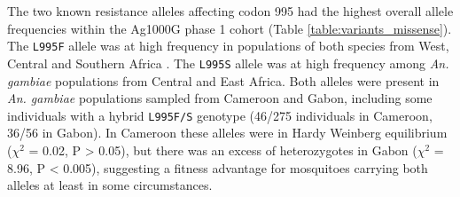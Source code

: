\documentclass[a4paper,11pt,abstracton,hidelinks]{scrartcl}
\begin{document}
{\begin{landscape}
\begin{table}[h]
\begin{threeparttable}
\begin{tablenotes}
  \end{tablenotes}

  \end{threeparttable}

\end{table}
\end{landscape}
\restoregeometry
} %


The two known resistance alleles affecting codon 995 had the highest overall allele frequencies within the Ag1000G phase 1 cohort (Table \ref{table:variants_missense}).
%
The \texttt{L995F} allele was at high frequency in populations of both species from West, Central and Southern Africa .
%
The \texttt{L995S} allele was at high frequency among \textit{An. gambiae} populations from Central and East Africa.
%
Both alleles were present in \textit{An. gambiae} populations sampled from Cameroon and Gabon, including some individuals with a hybrid \texttt{L995F/S} genotype (46/275 individuals in Cameroon, 36/56 in Gabon).
%
In Cameroon these alleles were in Hardy Weinberg equilibrium ($\chi^{2}$ = 0.02, P > 0.05), but there was an excess of heterozygotes in Gabon ($\chi^{2}$ = 8.96, P < 0.005), suggesting a fitness advantage for mosquitoes carrying both alleles at least in some circumstances.
\end{document}
